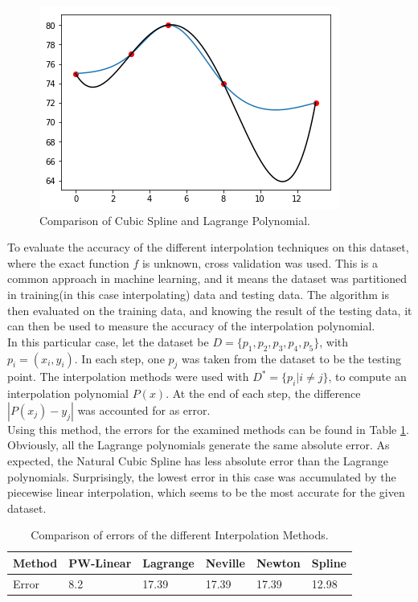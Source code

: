 \documentclass[a4paper,11pt, notitlepage]{article}
\newcommand{\enq}[1]{\grqq{}#1\grqq{}}
\begin{document}
\begin{onehalfspace}
\begin{figure}[H]
	\centering
	\includegraphics[]{./images/cs-lag-dataset.png}
	\caption{Comparison of Cubic Spline and Lagrange Polynomial.}
	\label{fig:cs-lag-dataset}
\end{figure}

To evaluate the accuracy of the different interpolation techniques on this dataset, where the exact function $f$ is unknown, cross validation was used. This is a common approach in machine learning, and it means the dataset was partitioned in \enq{training}(in this case interpolating) data and testing data. The algorithm is then evaluated on the training data, and knowing the result of the testing data, it can then be used to measure the accuracy of the interpolation polynomial. \\

In this particular case, let the dataset be $D=\{p_1, p_2, p_3, p_4, p_5\}$, with $p_i=(x_i, y_i)$. In each step, one $p_j$ was taken from the dataset to be the testing point. The interpolation methods were used with $D^*=\{p_i|i\neq j\}$, to compute an interpolation polynomial $P(x)$. At the end of each step, the difference $|P(x_j) - y_j|$ was accounted for as error. \\
Using this method, the errors for the examined methods can be found in Table \ref{tab:cv-errors}. \\
Obviously, all the Lagrange polynomials generate the same absolute error. As expected, the Natural Cubic Spline has less absolute error than the Lagrange polynomials. Surprisingly, the lowest error in this case was accumulated by the piecewise linear interpolation, which seems to be the most accurate for the given dataset.

\begin{table}[H]
	\centering
	\begin{tabular}{|l|l|l|l|l|l|}
		\hline
		Method & PW-Linear & Lagrange & Neville & Newton & Spline \\ \hline
		Error  & 8.2       & 17.39    & 17.39   & 17.39  & 12.98  \\ \hline
	\end{tabular}
	\caption{Comparison of errors of the different Interpolation Methods.}
	\label{tab:cv-errors}
\end{table}



\end{onehalfspace}
\end{document}

